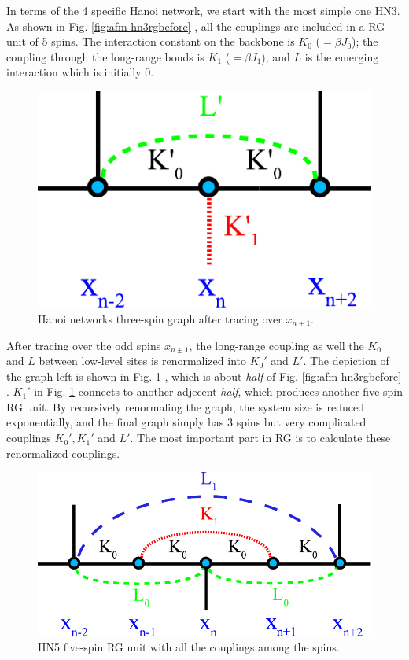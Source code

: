 In terms of the 4 specific Hanoi network, we start with the most simple one HN3. As shown in Fig. \ref{fig:afm-hn3rgbefore} \cite{Boettcher2011HNNP}, all the couplings are included in a RG unit of 5 spins. The interaction constant on the backbone is $K_0$ ($=\beta J_0$); the coupling through the long-range bonds is $K_1$ ($=\beta J_1$); and $L$ is the emerging interaction which is initially 0.

\begin{figure}
\centering \includegraphics[scale=0.68]{Chapter-3/RG3hanoi_after}
\protect\caption{Hanoi networks three-spin graph after tracing over $x_{n\pm 1}$.}
\label{fig:afm-hn3rgafter} 
\end{figure}

After tracing over the odd spins $x_{n\pm 1}$, the long-range coupling as well the $K_0$ and $L$ between low-level sites is renormalized into $K_0 '$ and $L'$. The depiction of the graph left is shown in Fig. \ref{fig:afm-hn3rgafter} \cite{Boettcher2011HNNP}, which is about {\it half} of  Fig. \ref{fig:afm-hn3rgbefore} \cite{Boettcher2011HNNP}. $K_1 '$ in Fig. \ref{fig:afm-hn3rgafter} \cite{Boettcher2011HNNP} connects to another adjecent {\it half}, which produces another five-spin RG unit. By recursively renormaling the graph, the system size is reduced exponentially, and the final graph simply has 3 spins but very complicated couplings $K_0 ', K_1 ' $ and $L'$. The most important part in RG is to calculate these renormalized couplings.


\begin{figure}
\centering \includegraphics[scale=0.68]{Chapter-3/IsingRG_HN5_before}
\protect\caption{HN5 five-spin RG unit with all the couplings among the spins.}
\label{fig:afm-hn5rg} 
\end{figure}

